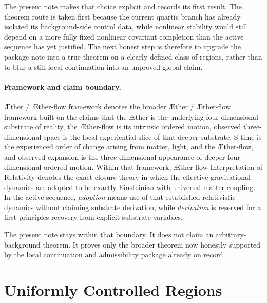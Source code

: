 \documentclass[11pt]{article}
\newcommand{\Aether}{\AE{}ther}
\newcommand{\Aflow}{\AE{}ther-flow}
\newcommand{\TheoryName}{\Aflow{} Interpretation of Relativity}
\newcommand{\TheoryProgram}{\Aether{} / \Aflow{} framework}
\begin{document}
The present note makes that choice explicit and records its first result. The theorem route is taken first because the current quartic branch has already isolated its background-side control data, while nonlinear stability would still depend on a more fully fixed nonlinear covariant completion than the active sequence has yet justified. The next honest step is therefore to upgrade the package note into a true theorem on a clearly defined class of regions, rather than to blur a still-local continuation into an unproved global claim.

\paragraph{Framework and claim boundary.}
\TheoryProgram{} denotes the broader \Aether{} / \Aflow{} framework built on the claims that the \Aether{} is the underlying four-dimensional substrate of reality, the \Aflow{} is its intrinsic ordered motion, observed three-dimensional space is the local experiential slice of that deeper substrate, S-time is the experienced order of change arising from matter, light, and the \Aflow{}, and observed expansion is the three-dimensional appearance of deeper four-dimensional ordered motion. Within that framework, \TheoryName{} denotes the exact-closure theory in which the effective gravitational dynamics are adopted to be exactly Einsteinian with universal matter coupling. In the active sequence, \emph{adoption} means use of that established relativistic dynamics without claiming substrate derivation, while \emph{derivation} is reserved for a first-principles recovery from explicit substrate variables.

The present note stays within that boundary. It does not claim an arbitrary-background theorem. It proves only the broader theorem now honestly supported by the local continuation and admissibility package already on record.

\section{Uniformly Controlled Regions}
\end{document}
